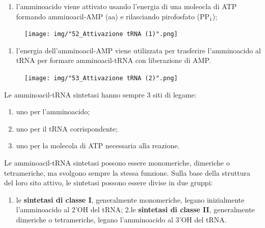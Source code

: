\documentclass[11pt]{book}
\begin{document}
\begin{enumerate}
\def\labelenumi{\arabic{enumi}.}
\itemsep1pt\parskip0pt
\item
  l'amminoacido viene attivato usando l'energia di una moleocla di ATP
  formando amminoacil-AMP (aa) e rilasciando pirofosfato (PP\(_1\));
\end{enumerate}

\begin{figure}[htp]
\centering
\texttt{[image: img/"52\_Attivazione tRNA (1)".png]}
\caption{}
\label{attivazione-trna-1}
\end{figure}

\begin{enumerate}
\def\labelenumi{\arabic{enumi}.}
\setcounter{enumi}{1}
\itemsep1pt\parskip0pt
\item
  l'energia dell'amminoacil-AMP viene utilizzata per trasferire
  l'amminoacido al tRNA per formare amminoacil-tRNA con liberazione di
  AMP.
\end{enumerate}

\begin{figure}[htp]
\centering
\texttt{[image: img/"53\_Attivazione tRNA (2)".png]}
\caption{}
\label{attivazione-trna-2}
\end{figure}

Le amminoacil-tRNA sintetasi hanno sempre 3 siti di legame:

\begin{enumerate}
\def\labelenumi{\arabic{enumi}.}
\itemsep1pt\parskip0pt
\item
  uno per l'amminoacido;
\item
  uno per il tRNA corrispondente;
\item
  uno per la molecola di ATP necessaria alla reazione.
\end{enumerate}

Le amminoacil-tRNA sintetasi possono essere monomeriche, dimeriche o
tetrameriche, ma svolgono sempre la stessa funzione. Sulla base della
struttura del loro sito attivo, le sintetasi possono essere divise in
due gruppi:

\begin{enumerate}
\def\labelenumi{\arabic{enumi}.}
\itemsep1pt\parskip0pt
\item
  le \textbf{sintetasi di classe I}, generalmente monomeriche, legano
  inizialmente l'amminoacido al 2'OH del tRNA; 2.le \textbf{sintetasi di
  classe II}, generalmente dimeriche o tetrameriche, legano
  l'amminoacido al 3'OH del tRNA.
\end{enumerate}
\end{document}
